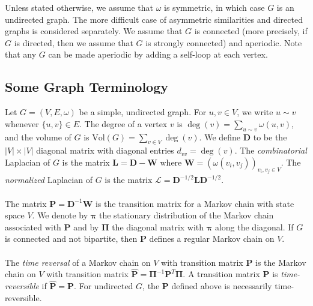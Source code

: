 \documentclass[10pt,twocolumn]{article}
\numberwithin{equation}{section}
\begin{document}
Unless stated otherwise, we assume that $\omega$ is symmetric,
in which case $G$ is an undirected graph.  The more difficult
case of asymmetric similarities and directed graphs is considered
separately.
We assume that $G$ is connected (more precisely, if $G$ is directed,
then we assume that $G$ is strongly connected) and aperiodic.
Note that any $G$ can be made aperiodic by adding a self-loop
at each vertex.

\subsection{Some Graph Terminology}
\label{sec:some-graphs-term}
Let $G = (V,E,\omega)$ be a simple, undirected graph. For $u,v \in V$,
we write $u \sim v$ whenever $\{u,v\} \in E$. The degree of a vertex
$v$ is $\deg(v) = \sum_{u \sim v}{\omega(u,v)}$, and the volume of $G$
is $\mathrm{Vol}(G) = \sum_{v \in V}{\deg(v)}$. We define $\mathbf{D}$
to be the $|V| \times |V|$ diagonal matrix with diagonal entries
$d_{vv} = \deg(v)$. The {\em combinatorial}\/ Laplacian of $G$ is the
matrix $\mathbf{L} = \mathbf{D} - \mathbf{W}$ where $\mathbf{W} =
(\omega(v_i,v_j))_{v_i,v_j \in V}$. The {\em normalized}\/ Laplacian of
$G$ is the matrix $\mathbf{\mathcal{L}} = \mathbf{D}^{-1/2} \mathbf{L}
\mathbf{D}^{-1/2}$. \\ \\
%
\noindent
The matrix $\mathbf{P} = \mathbf{D}^{-1}\mathbf{W}$ 
is the transition matrix
for a Markov chain with state space $V$. We denote by $\bm{\pi}$
the stationary distribution of the Markov chain associated with
$\mathbf{P}$ and by $\bm{\Pi}$ the diagonal matrix with $\bm{\pi}$
along the diagonal. If $G$ is connected and not bipartite, then
$\mathbf{P}$ defines a regular Markov chain on $V$. \\ \\
%
\noindent
The {\em time
  reversal}\/ of a Markov chain on $V$ with transition matrix
$\mathbf{P}$ is the Markov chain on $V$ with transition matrix
$\hat{\mathbf{P}} = \bm{\Pi}^{-1} \mathbf{P}^{T}
\bm{\Pi}$. 
A transition matrix
$\mathbf{P}$ is {\em time-reversible}\/ if $\hat{\mathbf{P}}
= \mathbf{P}$. For undirected $G$, the 
$\mathbf{P}$ defined above is necessarily time-reversible. 
\end{document}
